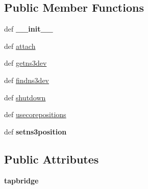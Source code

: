 \subsection*{Public Member Functions}
\begin{DoxyCompactItemize}
\item 
\hypertarget{classcorens3_1_1obj_1_1_core_ns3_net_a7b7059d1424c61861c4d3535bbbcecd4}{def {\bfseries \+\_\+\+\_\+init\+\_\+\+\_\+}}\label{classcorens3_1_1obj_1_1_core_ns3_net_a7b7059d1424c61861c4d3535bbbcecd4}

\item 
def \hyperlink{classcorens3_1_1obj_1_1_core_ns3_net_a9fee980b7e99143bffdb9095bcb28df8}{attach}
\item 
def \hyperlink{classcorens3_1_1obj_1_1_core_ns3_net_a41affaca635832739a4855ee15d68894}{getns3dev}
\item 
def \hyperlink{classcorens3_1_1obj_1_1_core_ns3_net_a2caeea7d1befca32bf526ee448901846}{findns3dev}
\item 
def \hyperlink{classcorens3_1_1obj_1_1_core_ns3_net_a84e99d6561684153d586e60867eefe2a}{shutdown}
\item 
def \hyperlink{classcorens3_1_1obj_1_1_core_ns3_net_acf6bbab2bd0684cd3313c9b5ed3ba1d7}{usecorepositions}
\item 
\hypertarget{classcorens3_1_1obj_1_1_core_ns3_net_a38b3e42fc5eb4cecf33550efad611960}{def {\bfseries setns3position}}\label{classcorens3_1_1obj_1_1_core_ns3_net_a38b3e42fc5eb4cecf33550efad611960}

\end{DoxyCompactItemize}
\subsection*{Public Attributes}
\begin{DoxyCompactItemize}
\item 
\hypertarget{classcorens3_1_1obj_1_1_core_ns3_net_afe5d840c161bc13ee008ac77642fcaf5}{{\bfseries tapbridge}}\label{classcorens3_1_1obj_1_1_core_ns3_net_afe5d840c161bc13ee008ac77642fcaf5}

\end{DoxyCompactItemize}
